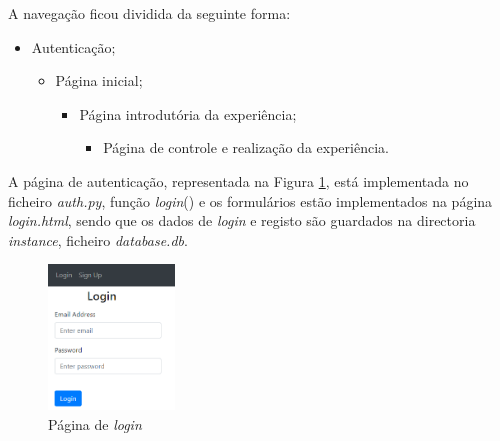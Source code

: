 A navegação ficou dividida da seguinte forma:
\begin{itemize}
	\item Autenticação;
	\begin{itemize}
		\item Página inicial;
		\begin{itemize}
			\item Página introdutória da experiência;
			\begin{itemize}
				\item Página de controle e realização da experiência.
			\end{itemize}
		\end{itemize}
	\end{itemize}
\end{itemize}

A página de autenticação, representada na Figura \ref{fig:paglogin}, está implementada no ficheiro \textit{auth.py}, função \textit{login}() e os formulários estão implementados na página \textit{login.html}, sendo que os dados de \textit{login} e registo são guardados na directoria \textit{instance}, ficheiro \textit{database.db}.

\begin{figure}[hbtp]
	\centering
	\includegraphics[width=0.3\textwidth]{figures/login.png}
	\caption{Página de \textit{login}}
	\label{fig:paglogin}
\end{figure}





